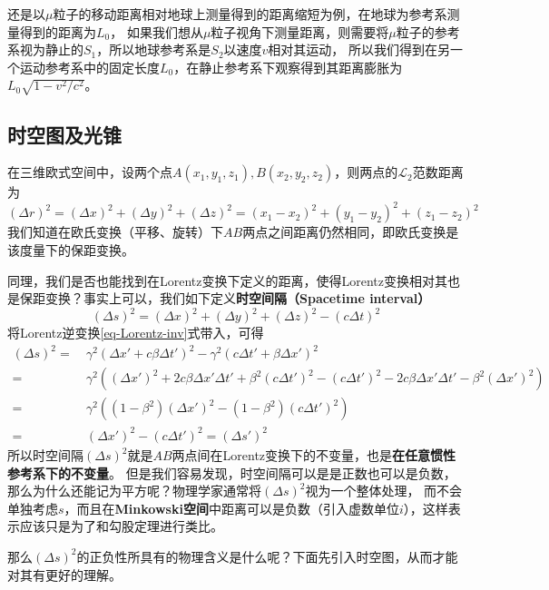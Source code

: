 \documentclass[12pt, a4paper, oneside]{ctexart}
\numberwithin{equation}{section}  %
\def\L{\mathcal{L}}         %
\begin{document}
还是以$\mu$粒子的移动距离相对地球上测量得到的距离缩短为例，在地球为参考系测量得到的距离为$L_0$，
如果我们想从$\mu$粒子视角下测量距离，则需要将$\mu$粒子的参考系视为静止的$S_1$，所以地球参考系是$S_2$以速度$v$相对其运动，
所以我们得到在另一个运动参考系中的固定长度$L_0$，在静止参考系下观察得到其距离膨胀为$L_0\sqrt{1-v^2/c^2}$。

\subsection{时空图及光锥}
在三维欧式空间中，设两个点$A(x_1,y_1,z_1),B(x_2,y_2,z_2)$，则两点的$\L_2$范数距离为
\begin{equation}
    (\Delta r)^2 = (\Delta x)^2 + (\Delta y)^2 + (\Delta z)^2 = (x_1-x_2)^2 + (y_1-y_2)^2 + (z_1-z_2)^2
\end{equation}
我们知道在欧氏变换（平移、旋转）下$AB$两点之间距离仍然相同，即欧氏变换是该度量下的保距变换。

同理，我们是否也能找到在Lorentz变换下定义的距离，使得Lorentz变换相对其也是保距变换？事实上可以，我们如下定义\textbf{时空间隔（Spacetime interval）}
\begin{equation}
    (\Delta s)^2 = (\Delta x)^2 + (\Delta y)^2 + (\Delta z)^2 - (c\Delta t)^2
\end{equation}
将Lorentz逆变换\ref{eq-Lorentz-inv}式带入，可得
\begin{equation}
\begin{aligned}
    (\Delta s)^2 =&\ \gamma^2(\Delta x'+c\beta\Delta t')^2 - \gamma^2(c\Delta t' + \beta\Delta x')^2\\
    =&\ \gamma^2\left((\Delta x')^2 + 2c\beta\Delta x'\Delta t' + \beta^2(c\Delta t')^2 - (c\Delta t')^2 - 2c\beta \Delta x'\Delta t' - \beta^2(\Delta x')^2\right)\\
    =&\ \gamma^2 \left((1-\beta^2)(\Delta x')^2 - (1-\beta^2)(c\Delta t')^2\right)\\
    =&\ (\Delta x')^2 - (c\Delta t')^2 = (\Delta s')^2
\end{aligned}
\end{equation}
所以时空间隔$(\Delta s)^2$就是$AB$两点间在Lorentz变换下的不变量，也是\textbf{在任意惯性参考系下的不变量}。
但是我们容易发现，时空间隔可以是是正数也可以是负数，那么为什么还能记为平方呢？物理学家通常将$(\Delta s)^2$视为一个整体处理，
而不会单独考虑$s$，而且在\textbf{Minkowski空间}中距离可以是负数（引入虚数单位$i$），这样表示应该只是为了和勾股定理进行类比。

那么$(\Delta s)^2$的正负性所具有的物理含义是什么呢？下面先引入时空图，从而才能对其有更好的理解。
\end{document}
